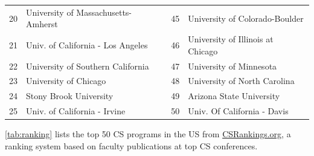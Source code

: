 \documentclass[oneside,11pt]{memoir}
\newcommand{\red}[1]{{\color{red}{#1}}}
\begin{document}
\begin{table}
\begin{tabular}{rl|rl}
    20 &  University of Massachusetts-Amherst\red{$^*$} &45& University of Colorado-Boulder \\
    21 & Univ. of California - Los Angeles &46& University of Illinois at Chicago  \\
    22 & University of Southern California &47& University of Minnesota \\ 
    23 & University of Chicago &48& University of North Carolina\red{$^*$} \\
    24 & Stony Brook University\red{$^*$} &49& Arizona State University\red{$^*$} \\
    25 &  Univ. of California - Irvine&50& Univ. Of California - Davis \\
    \bottomrule
  \end{tabular}
\end{table}
\autoref{tab:ranking} lists the top 50 CS programs in the US from \href{https://www.csrankings.org}{CSRankings.org}, a ranking system  based on faculty publications at top CS conferences.





\end{document}
